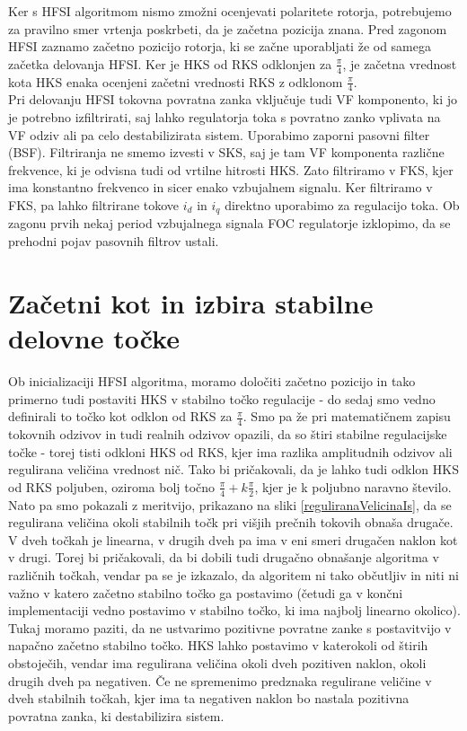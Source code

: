 \documentclass[a4paper,twoside,openright,12pt,slovene]{book}
\begin{document}
Ker s HFSI algoritmom nismo zmožni ocenjevati polaritete rotorja, potrebujemo za pravilno smer vrtenja poskrbeti, da je začetna pozicija znana. Pred zagonom HFSI zaznamo začetno pozicijo rotorja, ki
se začne uporabljati že od samega začetka delovanja HFSI. Ker je HKS od RKS odklonjen za $\frac{\pi}{4}$, je začetna vrednost kota HKS enaka ocenjeni začetni vrednosti RKS z odklonom $\frac{\pi}{4}$.
\\
Pri delovanju HFSI tokovna povratna zanka vključuje tudi VF komponento, ki jo je potrebno izfiltrirati, saj lahko regulatorja toka s povratno zanko vplivata na VF odziv ali pa celo destabilizirata
sistem. Uporabimo zaporni pasovni filter (BSF). Filtriranja ne smemo izvesti v SKS, saj je tam VF komponenta različne frekvence, ki je odvisna tudi od vrtilne hitrosti HKS. Zato filtriramo v FKS, kjer
ima konstantno frekvenco in sicer enako vzbujalnem signalu. Ker filtriramo v FKS, pa lahko filtrirane tokove $i_d$ in $i_q$ direktno uporabimo za regulacijo toka. Ob zagonu prvih nekaj period
vzbujalnega signala FOC regulatorje izklopimo, da se prehodni pojav pasovnih filtrov ustali. 


\section{Začetni kot in izbira stabilne delovne točke}

Ob inicializaciji HFSI algoritma, moramo določiti začetno pozicijo in tako primerno tudi postaviti HKS v stabilno točko regulacije - do sedaj smo vedno definirali to točko kot odklon od RKS za
$\frac{\pi}{4}$. Smo pa že pri matematičnem zapisu tokovnih odzivov in tudi realnih odzivov opazili, da so štiri stabilne regulacijske točke - torej tisti odkloni HKS od RKS, kjer ima razlika amplitudnih
odzivov ali regulirana veličina vrednost nič. Tako bi pričakovali, da je lahko tudi odklon HKS od RKS poljuben, oziroma bolj točno $\frac{\pi}{4} + k\frac{\pi}{2}$, kjer je k poljubno naravno število.
Nato pa smo pokazali z meritvijo, prikazano na sliki \ref{reguliranaVelicinaIs}, da se regulirana veličina okoli stabilnih točk pri višjih prečnih tokovih obnaša drugače. V dveh točkah je linearna, v
drugih dveh pa ima v eni smeri drugačen naklon kot v drugi. Torej bi pričakovali, da bi dobili tudi drugačno obnašanje algoritma v različnih točkah, vendar pa se je izkazalo, da algoritem ni tako
občutljiv in niti ni važno v katero začetno stabilno točko ga postavimo (četudi ga v končni implementaciji vedno postavimo v stabilno točko, ki ima najbolj linearno okolico). Tukaj moramo paziti, da
ne ustvarimo pozitivne povratne zanke s postavitvijo v napačno začetno stabilno točko. HKS lahko postavimo v katerokoli od štirih obstoječih, vendar ima regulirana veličina okoli dveh pozitiven
naklon, okoli drugih dveh pa negativen. Če ne spremenimo predznaka regulirane veličine v dveh stabilnih točkah, kjer ima ta negativen naklon bo nastala pozitivna povratna zanka, ki destabilizira
sistem.
\end{document}
